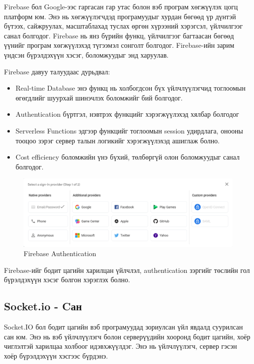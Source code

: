 Firebase бол Google-ээс гаргасан гар утас болон вэб програм хөгжүүлэх цогц платформ юм. Энэ нь хөгжүүлэгчдэд програмуудыг хурдан бөгөөд үр дүнтэй бүтээх, сайжруулах, масштаблахад туслах өргөн хүрээний хэрэгсэл, үйлчилгээг санал болгодог. Firebase нь янз бүрийн функц, үйлчилгээг багтаасан бөгөөд үүнийг програм хөгжүүлэхэд түгээмэл сонголт болгодог. Firebase-ийн зарим үндсэн бүрэлдэхүүн хэсэг, боломжуудыг энд харуулав.



Firebase давуу талуудаас дурьдвал:
\begin{itemize}
	\item Real-time Database энэ функц нь холбогдсон бүх үйлчлүүлэгчид тоглоомын өгөгдлийг шуурхай шинэчлэх боломжийг бий болгодог.
	\item Authentication бүртгэл, нэвтрэх функцийг хэрэгжүүлэхэд хялбар болгодог
	\item Serverless Functions эдгээр функцийг тоглоомын session удирдлага, онооны тооцоо зэрэг сервер талын логикийг хэрэгжүүлэхэд ашиглаж болно.
	\item Cost efficiency боломжийн үнэ бүхий, төлбөргүй олон боломжуудыг санал болгодог.
\end{itemize}

\begin{figure}[h]
	\centering
	\includegraphics[width=15cm]{images/firebase_auth.png}
	\caption{Firebase Authentication}
	\label{fig:research}
\end{figure}

Firebase-ийг бодит цагийн харилцан үйлчлэл, authentication зэргийг төслийн гол бүрэлдэхүүн хэсэг болгон хэрэглэх болно.

\subsection{Socket.io - Cан}

Socket.IO бол бодит цагийн вэб програмуудад зориулсан үйл явдалд суурилсан сан юм. Энэ нь вэб үйлчлүүлэгч болон серверүүдийн хооронд бодит цагийн, хоёр чиглэлтэй харилцаа холбоог идэвхжүүлдэг. Энэ нь үйлчлүүлэгч, сервер гэсэн хоёр бүрэлдэхүүн хэсгээс бүрдэнэ.

